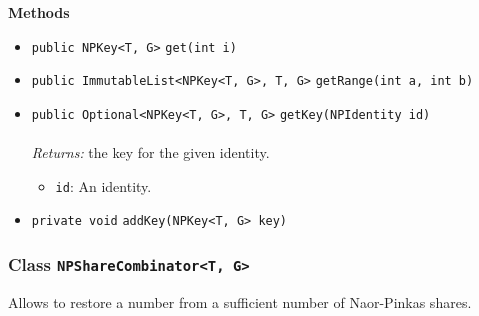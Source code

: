 \textbf{\sffamily Methods}
\begin{itemize}
\item \lstinline|public NPKey<T, G>| \lstinline|get|\lstinline|(int i)| \\[-0.6em]




\item \lstinline|public ImmutableList<NPKey<T, G>, T, G>| \lstinline|getRange|\lstinline|(int a, int b)| \\[-0.6em]




\item \lstinline|public Optional<NPKey<T, G>, T, G>| \lstinline|getKey|\lstinline|(NPIdentity id)|\\ \\[-0.6em]
\emph{Returns:} the key for the given identity.
\begin{itemize}
\item \lstinline|id|: An identity.
\end{itemize}



\item \lstinline|private void| \lstinline|addKey|\lstinline|(NPKey<T, G> key)| \\[-0.6em]




\end{itemize}

\subsubsection{Class \lstinline|NPShareCombinator<T, G>|}
Allows to restore a number from a sufficient number of Naor-Pinkas shares. \\
\noindent\begin{minipage}[t]{5cm}
\vspace{0.3em}
\hspace*{2em}
\vspace{0.3em}
\end{minipage}

